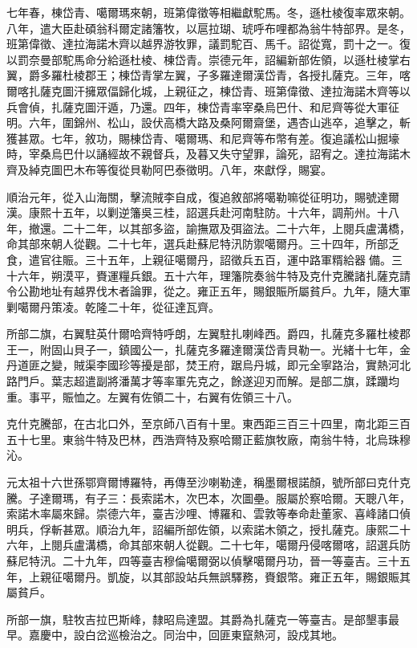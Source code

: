 \begin{pinyinscope}
七年春，棟岱青、噶爾瑪來朝，班第偉徵等相繼獻駝馬。冬，遜杜棱復率眾來朝。八年，遣大臣赴碩翁科爾定諸籓牧，以扈拉瑚、琥呼布哩都為翁牛特部界。是冬，班第偉徵、達拉海諾木齊以越界游牧罪，議罰駝百、馬千。詔從寬，罰十之一。復以罰奈曼部駝馬命分給遜杜棱、棟岱青。崇德元年，詔編新部佐領，以遜杜棱掌右翼，爵多羅杜棱郡王；棟岱青掌左翼，子多羅達爾漢岱青，各授扎薩克。三年，喀爾喀扎薩克圖汗擁眾偪歸化城，上親征之，棟岱青、班第偉徵、達拉海諾木齊等以兵會偵，扎薩克圖汗遁，乃還。四年，棟岱青率宰桑烏巴什、和尼齊等從大軍征明。六年，圍錦州、松山，設伏高橋大路及桑阿爾齋堡，遇杏山逃卒，追擊之，斬獲甚眾。七年，敘功，賜棟岱青、噶爾瑪、和尼齊等布幣有差。復追議松山掘壕時，宰桑烏巴什以誦經故不親督兵，及暮又失守望罪，論死，詔宥之。達拉海諾木齊及綽克圖巴木布等復從貝勒阿巴泰徵明。八年，來獻俘，賜宴。

順治元年，從入山海關，擊流賊李自成，復追敘部將噶勒嘛從征明功，賜號達爾漢。康熙十五年，以剿逆籓吳三桂，詔選兵赴河南駐防。十六年，調荊州。十八年，撤還。二十二年，以其部多盜，諭撫眾及弭盜法。二十六年，上閱兵盧溝橋，命其部來朝人從觀。二十七年，選兵赴蘇尼特汛防禦噶爾丹。三十四年，所部乏食，遣官往賑。三十五年，上親征噶爾丹，詔徵兵五百，運中路軍糈給器備。三十六年，朔漠平，賚運糧兵銀。五十六年，理籓院奏翁牛特及克什克騰諸扎薩克請令公勘地址有越界伐木者論罪，從之。雍正五年，賜銀賑所屬貧戶。九年，隨大軍剿噶爾丹策凌。乾隆二十年，從征達瓦齊。

所部二旗，右翼駐英什爾哈齊特呼朗，左翼駐扎喇峰西。爵四，扎薩克多羅杜棱郡王一，附固山貝子一，鎮國公一，扎薩克多羅達爾漢岱青貝勒一。光緒十七年，金丹道匪之變，賊渠李國珍等擾是部，焚王府，踞烏丹城，即元全寧路治，實熱河北路門戶。葉志超遣副將潘萬才等率軍先克之，餘遂迎刃而解。是部二旗，蹂躪均重。事平，賑恤之。左翼有佐領二十，右翼有佐領三十八。

克什克騰部，在古北口外，至京師八百有十里。東西距三百三十四里，南北距三百五十七里。東翁牛特及巴林，西浩齊特及察哈爾正藍旗牧廠，南翁牛特，北烏珠穆沁。

元太祖十六世孫鄂齊爾博羅特，再傳至沙喇勒達，稱墨爾根諾顏，號所部曰克什克騰。子達爾瑪，有子三：長索諾木，次巴本，次圖壘。服屬於察哈爾。天聰八年，索諾木率屬來歸。崇德六年，臺吉沙哩、博羅和、雲敦等奉命赴董家、喜峰諸口偵明兵，俘斬甚眾。順治九年，詔編所部佐領，以索諾木領之，授扎薩克。康熙二十六年，上閱兵盧溝橋，命其部來朝人從觀。二十七年，噶爾丹侵喀爾喀，詔選兵防蘇尼特汛。二十九年，四等臺吉穆倫噶爾弼以偵擊噶爾丹功，晉一等臺吉。三十五年，上親征噶爾丹。凱旋，以其部設站兵無誤驛務，賚銀幣。雍正五年，賜銀賑其屬貧戶。

所部一旗，駐牧吉拉巴斯峰，隸昭烏達盟。其爵為扎薩克一等臺吉。是部墾事最早。嘉慶中，設白岔巡檢治之。同治中，回匪東竄熱河，設戍其地。


\end{pinyinscope}
